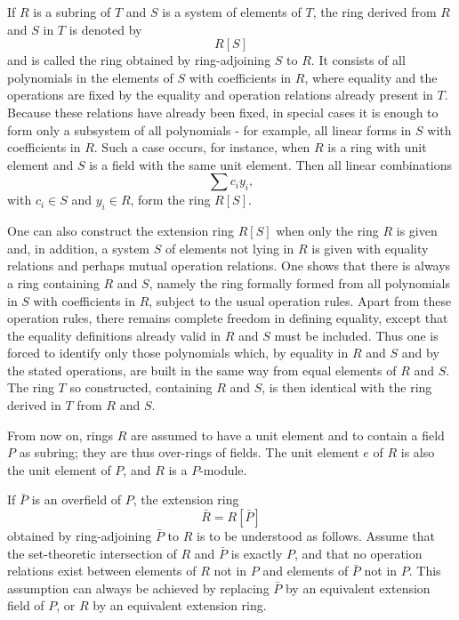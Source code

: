 \documentclass[
  12pt,
]{article}
\begin{document}
If \(R\) is a subring of \(T\) and \(S\) is a system of elements of
\(T\), the ring derived from \(R\) and \(S\) in \(T\) is denoted by \[
  R[S]
\] and is called the ring obtained by ring-adjoining \(S\) to \(R\). It
consists of all polynomials in the elements of \(S\) with coefficients
in \(R\), where equality and the operations are fixed by the equality
and operation relations already present in \(T\). Because these
relations have already been fixed, in special cases it is enough to form
only a subsystem of all polynomials - for example, all linear forms in
\(S\) with coefficients in \(R\). Such a case occurs, for instance, when
\(R\) is a ring with unit element and \(S\) is a field with the same
unit element. Then all linear combinations \[
  \sum c_i y_i,
\] with \(c_i\in S\) and \(y_i\in R\), form the ring \(R[S]\).

One can also construct the extension ring \(R[S]\) when only the ring
\(R\) is given and, in addition, a system \(S\) of elements not lying in
\(R\) is given with equality relations and perhaps mutual operation
relations. One shows that there is always a ring containing \(R\) and
\(S\), namely the ring formally formed from all polynomials in \(S\)
with coefficients in \(R\), subject to the usual operation rules. Apart
from these operation rules, there remains complete freedom in defining
equality, except that the equality definitions already valid in \(R\)
and \(S\) must be included. Thus one is forced to identify only those
polynomials which, by equality in \(R\) and \(S\) and by the stated
operations, are built in the same way from equal elements of \(R\) and
\(S\). The ring \(T\) so constructed, containing \(R\) and \(S\), is
then identical with the ring derived in \(T\) from \(R\) and \(S\).

From now on, rings \(R\) are assumed to have a unit element and to
contain a field \(P\) as subring; they are thus over-rings of fields.
The unit element \(e\) of \(R\) is also the unit element of \(P\), and
\(R\) is a \(P\)-module.

If \(\bar P\) is an overfield of \(P\), the extension ring \[
  \bar R=R[\bar P]
\] obtained by ring-adjoining \(\bar P\) to \(R\) is to be understood as
follows. Assume that the set-theoretic intersection of \(R\) and
\(\bar P\) is exactly \(P\), and that no operation relations exist
between elements of \(R\) not in \(P\) and elements of \(\bar P\) not in
\(P\). This assumption can always be achieved by replacing \(\bar P\) by
an equivalent extension field of \(P\), or \(R\) by an equivalent
extension ring.
\end{document}
